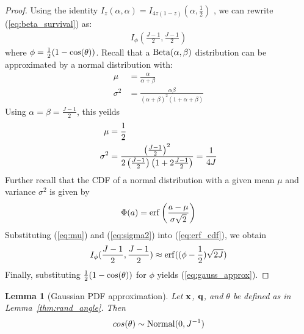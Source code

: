 \documentclass[]{article}
\newtheorem{lemma}{Lemma}[section]
\newtheorem{corollary}{Corrolary}[section]
\begin{document}
\begin{proof}
Using the identity $I_z(\alpha, \alpha) = I_{4z(1-z)}(\alpha, \frac{1}{2})$ \cite{DMLF_beta}, we can rewrite (\ref{eq:beta_survival}) as:
\begin{align}
    I_{\phi}(\frac{J-1}{2}, \frac{J-1}{2})
\end{align}
where $\phi = \frac{1}{2}(1 - \cos(\theta))$. Recall that a $\operatorname{Beta}(\alpha, \beta)$ distribution can be approximated by a normal distribution with:
\begin{align} \label{eq:normal_approx}
    \mu &= \frac{\alpha}{\alpha + \beta} \\
    \sigma^2 &= \frac{\alpha \beta}{(\alpha + \beta)^2(1 + \alpha + \beta)}
\end{align}
Using $\alpha = \beta = \frac{J-1}{2}$, this yeilds
\begin{align}
    \mu &= \frac{1}{2} \label{eq:mu} \\
    \sigma^2 &= \frac{ \left( \frac{J-1}{2} \right)^2 }{
        2 \left( \frac{J-1}{2} \right) \left( 1 + 2\frac{J-1}{2} \right)
    }
    = \frac{1}{4J}  \label{eq:sigma2}
\end{align}
Further recall that the CDF of a normal distribution with a given mean $\mu$ and variance $\sigma^2$ is given by
\begin{align} \label{eq:erf_cdf}
    \Phi(a) = \operatorname{erf} \left( \frac{a - \mu}{\sigma\sqrt{2}} \right)
\end{align}
Substituting (\ref{eq:mu}) and (\ref{eq:sigma2}) into (\ref{eq:erf_cdf}), we obtain
\begin{align} \label{eq:erf_cdf}
    I_{\phi}(\frac{J-1}{2}, \frac{J-1}{2}) \approx \operatorname{erf}((\phi - \frac{1}{2})\sqrt{2J})
\end{align}
Finally, substituting $\frac{1}{2}(1 - \cos(\theta))$ for $\phi$ yields (\ref{eq:gauss_approx}).
\end{proof}

\begin{lemma}[Gaussian PDF approximation] \label{thm:gauss_pdf}
Let $\mathbf{x}$, $\mathbf{q}$, and $\theta$ be defined as in Lemma~\ref{thm:rand_angle}. Then
\begin{align} \label{eq:normal_approx_pdf}
    cos(\theta) \sim \operatorname{Normal}(0, J^{-1})
\end{align}
\end{lemma}
\end{document}
